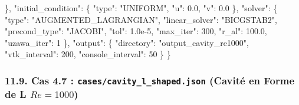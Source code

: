 \documentclass[
  french,
]{article}
\newenvironment{Shaded}{}{}
\newcommand{\DataTypeTok}[1]{\textcolor[rgb]{0.56,0.13,0.00}{#1}}
\newcommand{\DecValTok}[1]{\textcolor[rgb]{0.25,0.63,0.44}{#1}}
\newcommand{\FloatTok}[1]{\textcolor[rgb]{0.25,0.63,0.44}{#1}}
\newcommand{\FunctionTok}[1]{\textcolor[rgb]{0.02,0.16,0.49}{#1}}
\newcommand{\StringTok}[1]{\textcolor[rgb]{0.25,0.44,0.63}{#1}}
\begin{document}
\begin{Shaded}
\begin{Highlighting}[]
  \FunctionTok{\},}
  \DataTypeTok{"initial\_condition"}\FunctionTok{:} \FunctionTok{\{} \DataTypeTok{"type"}\FunctionTok{:} \StringTok{"UNIFORM"}\FunctionTok{,} \DataTypeTok{"u"}\FunctionTok{:} \FloatTok{0.0}\FunctionTok{,} \DataTypeTok{"v"}\FunctionTok{:} \FloatTok{0.0} \FunctionTok{\},}
  \DataTypeTok{"solver"}\FunctionTok{:} \FunctionTok{\{}
    \DataTypeTok{"type"}\FunctionTok{:} \StringTok{"AUGMENTED\_LAGRANGIAN"}\FunctionTok{,}
    \DataTypeTok{"linear\_solver"}\FunctionTok{:} \StringTok{"BICGSTAB2"}\FunctionTok{,}
    \DataTypeTok{"precond\_type"}\FunctionTok{:} \StringTok{"JACOBI"}\FunctionTok{,}
    \DataTypeTok{"tol"}\FunctionTok{:} \FloatTok{1.0e{-}5}\FunctionTok{,} \DataTypeTok{"max\_iter"}\FunctionTok{:} \DecValTok{300}\FunctionTok{,} \DataTypeTok{"r\_al"}\FunctionTok{:} \FloatTok{100.0}\FunctionTok{,} \DataTypeTok{"uzawa\_iter"}\FunctionTok{:} \DecValTok{1}
  \FunctionTok{\},}
  \DataTypeTok{"output"}\FunctionTok{:} \FunctionTok{\{} \DataTypeTok{"directory"}\FunctionTok{:} \StringTok{"output\_cavity\_re1000"}\FunctionTok{,} \DataTypeTok{"vtk\_interval"}\FunctionTok{:} \DecValTok{200}\FunctionTok{,} \DataTypeTok{"console\_interval"}\FunctionTok{:} \DecValTok{50} \FunctionTok{\}}
\FunctionTok{\}}
\end{Highlighting}
\end{Shaded}

\subsubsection{\texorpdfstring{11.9. Cas 4.7 :
\texttt{cases/cavity\_l\_shaped.json} (Cavité en Forme de L
\(Re=1000\))}{11.9. Cas 4.7 : cases/cavity\_l\_shaped.json (Cavité en Forme de L Re=1000)}}\label{cas-4.7-casescavity_l_shaped.json-cavituxe9-en-forme-de-l-re1000}
\end{document}
